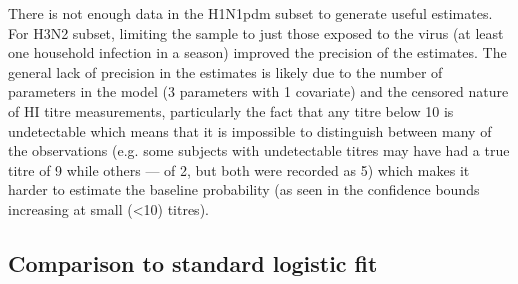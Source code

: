 \documentclass[12pt]{article}
\begin{document}
There is not enough data in the H1N1pdm subset to generate useful estimates. For H3N2 subset, limiting the sample to just those exposed to the virus (at least one household infection in a season) improved the precision of the estimates. The general lack of precision in the estimates is likely due to the number of parameters in the model (3 parameters with 1 covariate) and the censored nature of HI titre measurements, particularly the fact that any titre below 10 is undetectable which means that it is impossible to distinguish between many of the observations (e.g. some subjects with undetectable titres may have had a true titre of 9 while others --- of 2, but both were recorded as 5) which makes it harder to estimate the baseline probability (as seen in the confidence bounds increasing at small (<10) titres).

\subsection{Comparison to standard logistic fit}
\end{document}
